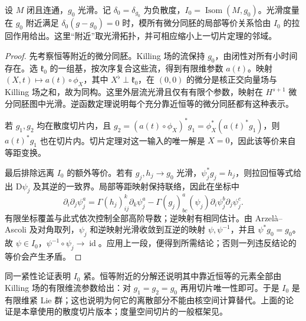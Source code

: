 \begin{proposition}\label{g3:prop:metric-slice-residual-isometries}
	设 \(M\) 闭且连通，\(g_0\) 光滑。记 \(\delta_0=\delta_{g_0}\) 为负散度，\(I_0=\operatorname{Isom}(M,g_0)\)。光滑度量在 \(g_0\) 附近满足 \(\delta_0(g-g_0)=0\) 时，模所有微分同胚的局部等价关系恰由 \(I_0\) 的拉回作用给出。这里“附近”取光滑拓扑，并可相应缩小上一切片定理的邻域。
\end{proposition}
\begin{proof}
	先考察恒等附近的微分同胚。Killing 场的流保持 \(g_0\)，由闭性对所有小时间存在。选 \(\mathfrak k_0\) 的一组基，按次序复合这些流，得到有限维参数 \(a(t)\)。映射 \((X,t)\mapsto a(t)\circ\phi_X\)，其中 \(X^\flat\perp\mathfrak k_0\)，在 \((0,0)\) 的微分是核正交向量场与 Killing 场之和，故为同构。这里外层流光滑且仅有有限个参数，映射在 \(H^{s+1}\) 微分同胚图中光滑。逆函数定理说明每个充分靠近恒等的微分同胚都有这种表示。

	若 \(g_1,g_2\) 均在散度切片内，且 \(g_2=(a(t)\circ\phi_X)^*g_1=\phi_X^*(a(t)^*g_1)\)，则 \(a(t)^*g_1\) 也在切片内。切片定理对这一输入的唯一解是 \(X=0\)，因此该等价来自等距变换。

	最后排除远离 \(I_0\) 的额外等价。若有 \(g_j,h_j\to g_0\) 光滑，\(\psi_j^*g_j=h_j\)，则拉回恒等式给出 \(\mathrm D\psi_j\) 及其逆的一致界。局部等距映射保持联络，因此在坐标中
	\[
		\partial_i\partial_j\psi_j^a
		=\Gamma(h_j)^k_{ij}\partial_k\psi_j^a
		-\Gamma(g_j)^a_{bc}(\psi_j)\partial_i\psi_j^b\partial_j\psi_j^c.
	\]
	有限坐标覆盖与此式依次控制全部高阶导数；逆映射有相同估计。由 Arzelà--Ascoli 及对角取列，\(\psi_j\) 和逆映射光滑收敛到互逆的映射 \(\psi,\psi^{-1}\)，并且 \(\psi^*g_0=g_0\)。故 \(\psi\in I_0\)，\(\psi^{-1}\circ\psi_j\to\operatorname{id}\)。应用上一段，便得到所需结论；否则一列违反结论的等价会产生矛盾。
\end{proof}

同一紧性论证表明 \(I_0\) 紧。恒等附近的分解还说明其中靠近恒等的元素全部由 Killing 场的有限维流参数给出：对 \(g_1=g_2=g_0\) 再用切片唯一性即可。于是 \(I_0\) 是有限维紧 Lie 群；这也说明为何它的离散部分不能由核空间计算替代。上面的论证是本章使用的散度切片版本；度量空间切片的一般框架见\cite[第7节，定理7.4，第33--34页]{Ebin1970Metrics}。
